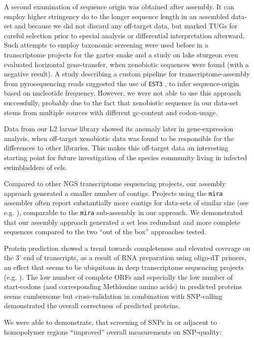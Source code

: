 \documentclass[10pt]{bmc_article}
\newenvironment{bmcformat}{\begin{raggedright}\baselineskip20pt\sloppy\setboolean{publ}{false}}{\end{raggedright}\baselineskip20pt\sloppy}
\begin{document}
\begin{bmcformat}
A second examination of sequence origin was obtained after
assembly. It can employ higher stringency do to the longer sequence
length in an assembled data-set and because we did not discard any
off-target data, but marked TUGs for careful selection prior to
special analysis or differential interpretation afterward. Such
attempts to employ taxonomic screening were used before in a
transcriptome projects for the garter snake \cite{pmid21138572} and a
study on lake sturgeon even evaluated horizontal gene-transfer, when
xenobiotic sequences were found \cite{pmid20386959} (with a negative
result). A study describing a custom pipeline for
transcriptome-assembly from pyrosequencing reads \cite{pmid20034392}
suggested the use of \texttt{EST3} \cite{pmid17218127}, to infer
sequence-origin based on nucleotide frequency. However, we were not
able to use this approach successfully, probably due to the fact that
xenobiotic sequence in our data-set stems from multiple sources with
different gc-content and codon-usage.

Data from our L2 larvae library showed its anomaly later in
gene-expression analysis, when off-target xenobiotic data was found to
be responsible for the differences to other libraries. This makes this
off-target data an interesting starting point for future investigation
of the species community living in infected swimbladders of eels.

Compared to other NGS transcriptome sequencing projects, our assembly
approach generated a smaller number of contigs. Projects using the
\texttt{mira} assembler often report substantially more contigs for
data-sets of similar size (see e.g. \cite{pmid21364769}), comparable
to the \texttt{mira} sub-assembly in our approach. We demonstrated that
our assembly approach generated a set less redundant and more complete
sequences compared to the two ``out of the box'' approaches tested.

Protein prediction showed a trend towards completeness and elevated
coverage on the 3’ end of transcripts, as a result of RNA preparation
using oligo-dT primers, an effect that seems to be ubiquitous in deep
transcriptome sequencing projects (e.g. \cite{pmid20331785}). The low
number of complete ORFs and especially the low number of start-codons
(and corresponding Methionine amino acids) in predicted proteins seems
cumbersome but cross-validation in combination with SNP-calling
demonstrated the overall correctness of predicted proteins.

We were able to demonstrate, that screening of SNPs in or adjacent to
homopolymer regions ``improved'' overall measurements on SNP-quality:


\end{bmcformat}
\end{document}
